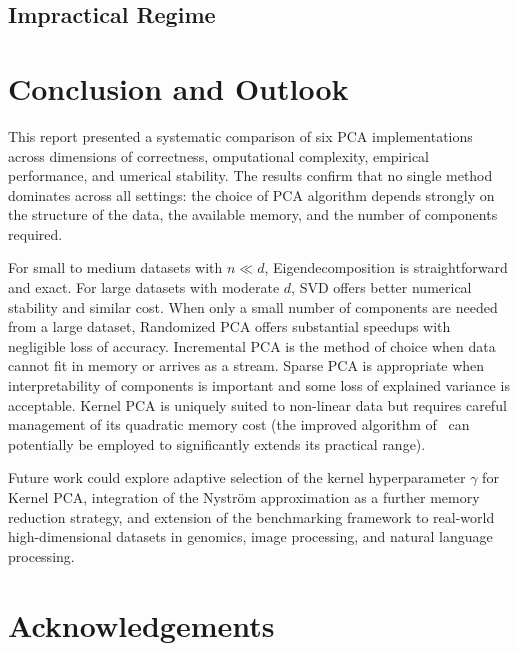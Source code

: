 \subsection{Impractical Regime}



\section{Conclusion and Outlook}

This report presented a systematic comparison of six PCA implementations across dimensions of correctness, omputational complexity, empirical performance, and  umerical stability. The results confirm that no single method dominates across all settings: the choice of PCA algorithm depends strongly on the structure of the data, the available memory, and the number of components required.

For small to medium datasets with $n \ll d$, Eigendecomposition is straightforward and exact. For large datasets with moderate $d$, SVD offers better numerical stability and similar cost. When only a small number of components are needed from a large dataset, Randomized PCA offers substantial speedups with negligible loss of accuracy. Incremental PCA is the method of choice when data cannot fit in memory or arrives as a stream. Sparse PCA is
appropriate when interpretability of components is important and some loss of explained variance is acceptable. Kernel PCA is uniquely suited to non-linear data but requires careful management of its quadratic memory cost (the improved
algorithm of~\citet{zheng2005improved} can potentially be employed to significantly extends its practical range).

Future work could explore adaptive selection of the kernel hyperparameter $\gamma$ for Kernel PCA, integration of the Nystr\"{o}m approximation as a further memory reduction strategy, and extension of the benchmarking framework to real-world high-dimensional datasets in genomics, image processing, and natural language processing.

\section{Acknowledgements}

